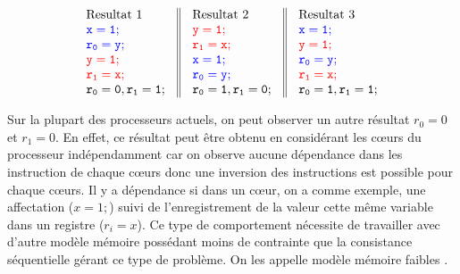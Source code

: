 \documentclass[12pt,a4paper]{article}
\begin{document}
\[
\begin{array}{c||c||c}
  \begin{array}{l}
    \text{Resultat 1} \\
    \textcolor[rgb]{0,0,1}{\mathtt{x = 1;}} \\
    \textcolor[rgb]{0,0,1}{\mathtt{r_0 = y;}} \\
    \textcolor[rgb]{1,0,0}{\mathtt{y = 1;}} \\
    \textcolor[rgb]{1,0,0}{\mathtt{r_1 = x;}} \\
    \mathtt{r_0 = 0, r_1 = 1;} \\
  \end{array} &
  \begin{array}{l}
    \text{Resultat 2} \\
    \textcolor[rgb]{1,0,0}{\mathtt{y = 1;}} \\
    \textcolor[rgb]{1,0,0}{\mathtt{r_1 = x;}} \\
    \textcolor[rgb]{0,0,1}{\mathtt{x = 1;}} \\
    \textcolor[rgb]{0,0,1}{\mathtt{r_0 = y;}} \\
    \mathtt{r_0 = 1, r_1 = 0;} \\
  \end{array} &
    \begin{array}{l}
    \text{Resultat 3} \\
    \textcolor[rgb]{0,0,1}{\mathtt{x = 1;}} \\
    \textcolor[rgb]{1,0,0}{\mathtt{y = 1;}} \\
    \textcolor[rgb]{0,0,1}{\mathtt{r_0 = y;}} \\
    \textcolor[rgb]{1,0,0}{\mathtt{r_1 = x;}} \\
    \mathtt{r_0 = 1, r_1 = 1;} \\
  \end{array} 
\end{array}
\]

Sur la plupart des processeurs actuels, on peut observer un autre résultat $r_0 = 0$ et $r_1 = 0$. En effet, ce résultat peut être obtenu en considérant les cœurs du processeur indépendamment car on observe aucune dépendance dans les instruction de chaque cœurs donc une inversion des instructions est possible pour chaque cœurs. Il y a dépendance si dans un cœur, on a comme exemple, une affectation ($x = 1;$) suivi de l'enregistrement de la valeur cette même variable dans un registre ($r_i = x$). Ce type de comportement nécessite de travailler avec d'autre modèle mémoire possédant moins de contrainte que la consistance séquentielle gérant ce type de problème. On les appelle modèle mémoire faibles \cite{Adve:1996:SMC:619013.620590}. 
\end{document}
